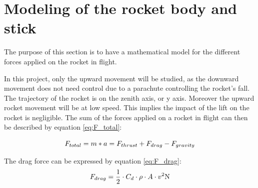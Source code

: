 %			
%			
		
		\section{Modeling of the rocket body and stick}
			
		The purpose of this section is to have a mathematical model for the different forces applied on the rocket in flight. 
		
		In this project, only the upward movement will be studied, as the downward movement does not need control due to a parachute controlling the rocket's fall. The trajectory of the rocket is on the zenith axis, or y axis.   Moreover the upward rocket movement will be at low speed. This implies the impact of the lift on the rocket is negligible. The sum of the forces applied on a rocket in flight can then be described by equation \vref{eq:F_total}:
		
		\begin{equation}
		F_{total} = m*a = F_{thrust} + F_{drag} - F_{gravity} \addunit{\newton} \label{eq:F_{total}}
		\end{equation}
		\startexplain
		\stopexplain
		
		The drag force can be expressed by equation \vref{eq:F_drag}:
		\begin{equation}
		F_{drag} = \frac{1}{2} \cdot C_{d} \cdot \rho \cdot A \cdot v^2 \si{\newton} \label{eq:F_{drag}}
		\end{equation}
		\startexplain
		\stopexplain
			
